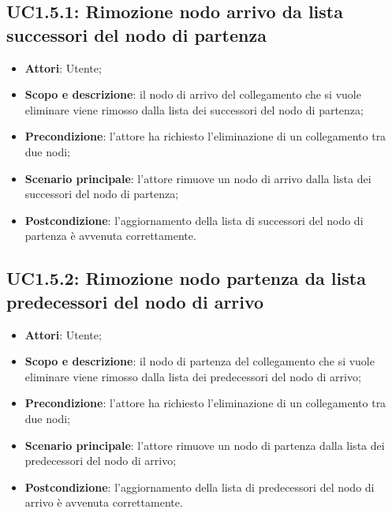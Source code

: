 \subsection{UC1.5.1: Rimozione nodo arrivo da lista successori del nodo di partenza} 
\hypertarget{UC1.5.1}{} 
\begin{itemize} 
	\item{\textbf{Attori}: Utente;} 
	\item{\textbf{Scopo e descrizione}: il nodo di arrivo del collegamento che si vuole eliminare viene rimosso dalla lista dei successori del nodo di partenza;} 
	\item{\textbf{Precondizione}: l'attore ha richiesto l'eliminazione di un collegamento tra due nodi;}
	\item{\textbf{Scenario principale}: l'attore rimuove un nodo di arrivo dalla lista dei successori del nodo di partenza;} 
	\item{\textbf{Postcondizione}: l'aggiornamento della lista di successori del nodo di partenza è avvenuta correttamente.} 
\end{itemize} 
\subsection{UC1.5.2: Rimozione nodo partenza da lista predecessori del nodo di arrivo} 
\hypertarget{UC1.5.2}{} 
\begin{itemize} 
	\item{\textbf{Attori}: Utente;} 
	\item{\textbf{Scopo e descrizione}: il nodo di partenza del collegamento che si vuole eliminare viene rimosso dalla lista dei predecessori del nodo di arrivo;} 
	\item{\textbf{Precondizione}: l'attore ha richiesto l'eliminazione di un collegamento tra due nodi;}
	\item{\textbf{Scenario principale}: l'attore rimuove un nodo di partenza dalla lista dei predecessori del nodo di arrivo;}  
	\item{\textbf{Postcondizione}: l'aggiornamento della lista di predecessori del nodo di arrivo è avvenuta correttamente.} 
\end{itemize} 
